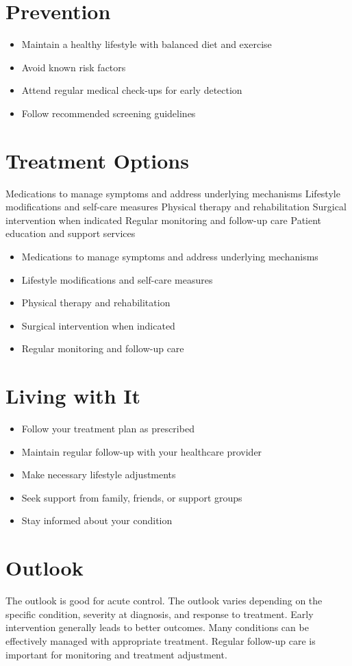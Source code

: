 \section{Prevention}
\begin{itemize}[noitemsep]
  \item Maintain a healthy lifestyle with balanced diet and exercise
  \item Avoid known risk factors
  \item Attend regular medical check-ups for early detection
  \item Follow recommended screening guidelines
\end{itemize}
\section{Treatment Options}
Medications to manage symptoms and address underlying mechanisms Lifestyle modifications and self-care measures Physical therapy and rehabilitation Surgical intervention when indicated Regular monitoring and follow-up care Patient education and support services

\begin{itemize}[noitemsep]
  \item Medications to manage symptoms and address underlying mechanisms
  \item Lifestyle modifications and self-care measures
  \item Physical therapy and rehabilitation
  \item Surgical intervention when indicated
  \item Regular monitoring and follow-up care
\end{itemize}
\section{Living with It}
\begin{itemize}[noitemsep]
  \item Follow your treatment plan as prescribed
  \item Maintain regular follow-up with your healthcare provider
  \item Make necessary lifestyle adjustments
  \item Seek support from family, friends, or support groups
  \item Stay informed about your condition
\end{itemize}
\section{Outlook}
The outlook is good for acute control. The outlook varies depending on the specific condition, severity at diagnosis, and response to treatment. Early intervention generally leads to better outcomes. Many conditions can be effectively managed with appropriate treatment. Regular follow-up care is important for monitoring and treatment adjustment.
